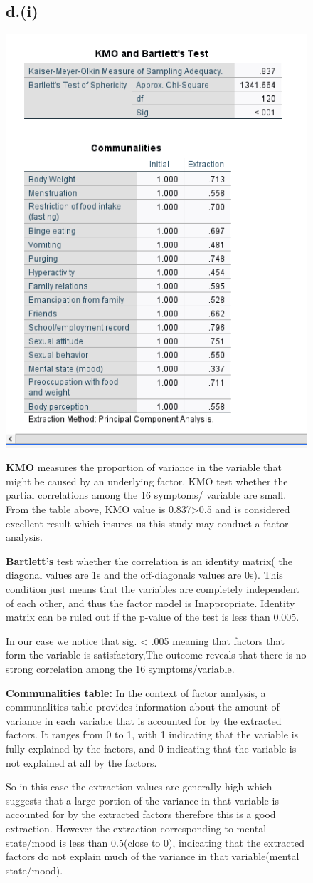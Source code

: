 \documentclass[english,10pt,a4paper]{article}
\begin{document}
	\begin{figure}
	\subsection*{d.(i)}

\includegraphics[width=0.5\linewidth]{KMO.png}

\textbf{KMO} measures the proportion of variance in the variable that might be caused by an underlying factor. KMO test whether the partial correlations among the 16 symptoms/ variable  are small.	
From the table above, KMO value is 0.837>0.5 and is considered excellent result which insures us this study may conduct a factor analysis.

	\textbf{Bartlett's} test whether the correlation is an identity matrix( the diagonal values are 1s and the off-diagonals values are 0s). This condition just means that the variables are completely independent of each other, and thus the factor model is Inappropriate. Identity matrix can be ruled out if the p-value of the test is less than 0.005.
	
	In our case we notice that sig. < .005 meaning that factors that form the variable is satisfactory,The outcome reveals that there is no strong correlation among the 16 symptoms/variable.
	
\par
\textbf{Communalities table:} In the context of factor analysis, a communalities table provides information about the amount of variance in each variable that is accounted for by the extracted factors. It ranges from 0 to 1, with 1 indicating that the variable is fully explained by the factors, and 0 indicating that the variable is not explained at all by the factors. 

So in this case the extraction values are generally high  which suggests that a large portion of the variance in that variable is accounted for by the extracted factors therefore this is a good extraction. However the extraction corresponding to mental state/mood is less than 0.5(close to 0),  indicating that the extracted factors do not explain much of the variance in that variable(mental state/mood). 
	

	

\end{figure}
\end{document}
